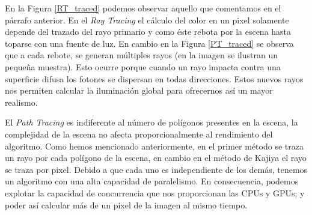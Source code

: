 \documentclass[titlepage,12pt]{article}
\begin{document}
En la Figura \ref{RT_traced} podemos observar aquello que comentamos en el párrafo anterior. En el \textit{Ray Tracing} el cálculo del color en un pixel solamente depende del trazado del rayo primario y como éste rebota por la escena hasta toparse con una fuente de luz. En cambio en la Figura \ref{PT_traced} se observa que a cada rebote, se generan múltiples rayos (en la imagen se ilustran un pequeña muestra). Esto ocurre porque cuando un rayo impacta contra una superficie difusa los fotones se dispersan en todas direcciones. Estos nuevos rayos nos permiten calcular la iluminación global para ofrecernos así un mayor realismo. 

El \textit{Path Tracing} es indiferente al número de polígonos presentes en la escena, la complejidad de la escena no afecta proporcionalmente al rendimiento del algoritmo. Como hemos mencionado anteriormente, en el primer método se traza un rayo por cada polígono de la escena, en cambio en el método de Kajiya el rayo se traza por pixel. Debido a que cada uno es independiente de los demás, tenemos un algoritmo con una alta capacidad de paralelismo. En consecuencia, podemos explotar la capacidad de concurrencia que nos proporcionan las CPUs y GPUs; y poder así calcular más de un pixel de la imagen al mismo tiempo.
\end{document}
